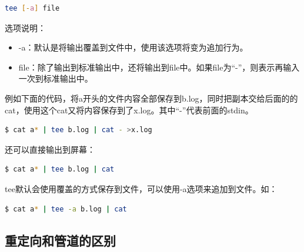 \documentclass[doctor,openright,twoside]{sjtuthesis}
\providecommand{\tightlist}{%
    \setlength{\itemsep}{0pt}\setlength{\parskip}{0pt}}
\theoremstyle{plain}
\theoremstyle{definition}
\theoremstyle{remark}
\theoremstyle{ocrenumbox}
\theoremstyle{plain}
\begin{document}
\begin{lstlisting}[language=bash]
tee [-a] file
\end{lstlisting}

选项说明：

\begin{itemize}
\tightlist
\item
  -a：默认是将输出覆盖到文件中，使用该选项将变为追加行为。
\item
  file：除了输出到标准输出中，还将输出到file中。如果file为``-''，则表示再输入一次到标准输出中。
\end{itemize}

例如下面的代码，将a开头的文件内容全部保存到b.log，同时把副本交给后面的的cat，使用这个cat又将内容保存到了x.log。其中``-''代表前面的stdin。

\begin{lstlisting}[language=bash]
$ cat a* | tee b.log | cat - >x.log
\end{lstlisting}

还可以直接输出到屏幕：

\begin{lstlisting}[language=bash]
$ cat a* | tee b.log | cat
\end{lstlisting}

tee默认会使用覆盖的方式保存到文件，可以使用-a选项来追加到文件。如：

\begin{lstlisting}[language=bash]
$ cat a* | tee -a b.log | cat
\end{lstlisting}

\subsection{重定向和管道的区别}
\end{document}
